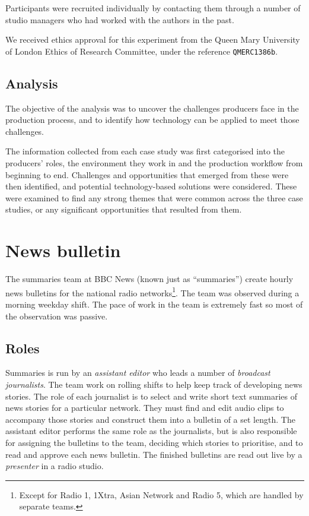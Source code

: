 Participants were recruited individually by contacting them through a number of
studio managers who had worked with the authors in the past. 

We received ethics approval for this experiment from the Queen Mary University of London Ethics of Research Committee, under the reference \texttt{QMERC1386b}.


\subsection{Analysis}
The objective of the analysis was to uncover the challenges producers face in
the production process, and to identify how technology can be applied to meet
those challenges.

The information collected from each case study was first categorised into the
producers' roles, the environment they work in and the production workflow from
beginning to end. Challenges and opportunities that emerged from these were
then identified, and potential technology-based solutions were considered.
These were examined to find any strong themes that were common across the
three case studies, or any significant opportunities that resulted from them.

\section{News bulletin}\label{sec:news}
The summaries team at BBC News (known just as ``summaries'') create hourly news
bulletins for the national radio networks\footnote{Except for Radio 1, 1Xtra,
  Asian Network and Radio 5, which are handled by separate teams.}. The team
was observed during a morning weekday shift. The pace of work in the team is
extremely fast so most of the observation was passive.

\subsection{Roles}\label{sec:news-roles}
Summaries is run by an \textit{assistant editor} who leads a number of
\textit{broadcast journalists}. The team work on rolling shifts to help keep
track of developing news stories. The role of each journalist is to select and
write short text summaries of news stories for a particular network. They must
find and edit audio clips to accompany those stories and construct them into a
bulletin of a set length.  The assistant editor performs the same role as the
journalists, but is also responsible for assigning the bulletins to the team,
deciding which stories to prioritise, and to read and approve each news
bulletin. The finished bulletins are read out live by a \textit{presenter} in a
radio studio.

